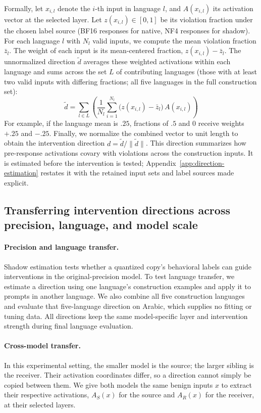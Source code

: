 Formally, let $x_{i,l}$ denote the $i$-th input in language $l$, and
$A(x_{i,l})$ its activation vector at the selected layer. Let
$z(x_{i,l}) \in [0,1]$ be its violation fraction under the chosen label source (BF16 responses for native, NF4 responses for shadow). For each language $l$ with $N_l$ valid inputs, we compute the mean violation fraction $\bar{z}_l$. The weight of each input is its mean-centered fraction, $z(x_{i,l}) - \bar{z}_l$. The unnormalized direction $\tilde{d}$ averages these weighted activations within each language and sums across the set $L$ of contributing languages (those with at least two valid inputs with differing fractions; all five languages in the full construction set):
\begin{equation}
    \tilde{d} = \sum_{l \in L} \left( \frac{1}{N_l} \sum_{i=1}^{N_l}
    \bigl(z(x_{i,l}) - \bar{z}_l\bigr)\, A(x_{i,l}) \right)
\end{equation}
For example, if the language mean is $.25$, fractions of $.5$ and $0$ receive weights $+.25$ and $-.25$. Finally, we normalize the combined vector to unit length to obtain the intervention direction
$d = \tilde{d} / \|\tilde{d}\|$. This direction summarizes how
pre-response activations covary with violations across the construction inputs. It is estimated before the intervention is tested; Appendix~\ref{app:direction-estimation} restates it with the retained input sets and label sources made explicit.


\subsection{Transferring intervention directions across precision, language, and model scale}
\label{sec:cross-scale-design}

\paragraph{Precision and language transfer.}
Shadow estimation tests whether a quantized copy's behavioral labels can guide interventions in the original-precision model. To test language transfer, we estimate a direction using one language's construction examples and apply it to prompts in another language. We also combine all five construction languages and evaluate that five-language direction on Arabic, which supplies no fitting or tuning data. All directions keep the same model-specific layer and intervention strength during final language evaluation.

\paragraph{Cross-model transfer.}
In this experimental setting, the smaller model is the source; the larger sibling is the receiver. Their activation coordinates differ, so a direction cannot simply be copied between them. We give both models the same benign inputs $x$ to extract their respective activations, $A_S(x)$ for the source and $A_R(x)$ for the receiver, at their selected layers.

